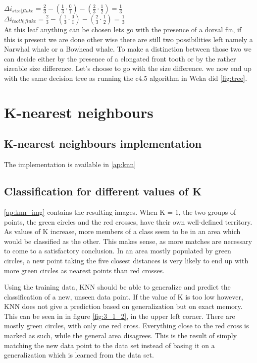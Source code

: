 \documentclass[10pt,a4paper]{article}
\begin{document}
{$\Delta i_{size | fluke} = \frac{2}{3} - \left ( \frac{1}{3}  \cdot \frac{0}{1} \right ) - \left ( \frac{2}{3} \cdot \frac{1}{2}\right ) = \frac{1}{3}$\\
$\Delta i_{tooth | fluke} = \frac{2}{3} - \left ( \frac{1}{3}  \cdot \frac{0}{1} \right ) - \left ( \frac{2}{3} \cdot \frac{1}{2}\right ) = \frac{1}{3}$\\
At this leaf anything can be chosen lets go with the presence of a dorsal fin, if this is present we are done other wise there are still two possibilities left namely a Narwhal whale or a Bowhead whale. To make a distinction between those two we can decide either by the presence of a elongated front tooth or by the rather sizeable size difference. Let's choose to go with the size difference. we now end up with the same decision tree as running the c4.5 algorithm in Weka did \ref{fig:tree}.

\section{K-nearest neighbours}
\subsection{K-nearest neighbours implementation}
The implementation is available in \ref{ap:knn}

\subsection{Classification for different values of K} \label{ss:class}
\ref{ap:knn_img} contains the resulting images. When K = 1, the two groups of points, the green circles and the red crosses, have their own well-defined territory. As values of K increase, more members of a class seem to be in an area which would be classified as the other. This makes sense, as more matches are necessary to come to a satisfactory conclusion. In an area mostly populated by green circles, a new point taking the five closest distances is very likely to end up with more green circles as nearest points than red crosses.

Using the training data, KNN should be able to generalize and predict the classification of a new, unseen data point. If the value of K is too low however, KNN does not give a prediction based on generalization but on exact memory. This can be seen in in figure \ref{fig:3_1_2}, in the upper left corner. There are mostly green circles, with only one red cross. Everything close to the red cross is marked as such, while the general area disagrees. This is the result of simply matching the new data point to the data set instead of basing it on a generalization which is learned from the data set.

}
\end{document}
